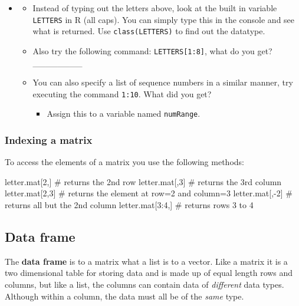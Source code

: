 \documentclass[a4paper]{book}
\newenvironment{Shaded}{}{}
\newcommand{\DecValTok}[1]{{#1}}
\newcommand{\CommentTok}[1]{\textcolor[rgb]{0.00,0.50,0.00}{{#1}}}
\newcommand{\NormalTok}[1]{{#1}}
\providecommand{\tightlist}{%
  \setlength{\itemsep}{0pt}\setlength{\parskip}{0pt}}
\newlength{\leftbarwidth}
\newlength{\leftbarsep}
\newcommand*{\leftbarcolorcmd}{\color{darkgray}}%
\renewenvironment{leftbar}{%
    \def\FrameCommand{{\leftbarcolorcmd{\vrule width \leftbarwidth\relax\hspace {\leftbarsep}}}}%
    \MakeFramed {\advance \hsize -\width \FrameRestore }%
}{%
    \endMakeFramed
}
\renewenvironment{Shaded}
{\vspace{0em}\begin{leftbar}\begin{snugshade}}
{\end{snugshade}\end{leftbar}\vspace{0pt}}
\newenvironment{rmdblock}[1]
  {\vspace{1.5em}\begin{shaded*}
  \begin{itemize}
  \renewcommand{\labelitemi}{
    \raisebox{-.7\height}[0pt][0pt]{
      {\setkeys{Gin}{width=3em,keepaspectratio}\texttt{[image: images/\#1]}}
    }
  }
  \item
  }
  {
  \end{itemize}
  \end{shaded*}
  }
\newenvironment{rmdtip}
  {\begin{rmdblock}{tip}}
  {\end{rmdblock}}
\begin{document}
\begin{rmdtip}
\begin{itemize}
\item
  Instead of typing out the letters above, look at the built in variable
  \texttt{LETTERS} in R (all caps). You can simply type this in the
  console and see what is returned. Use \texttt{class(LETTERS)} to find
  out the datatype.
\item
  Also try the following command: \texttt{LETTERS{[}1:8{]}}, what do you
  get? \_\_\_\_\_\_\_\_
\item
  You can also specify a list of sequence numbers in a similar manner,
  try executing the command \texttt{1:10}. What did you get?

  \begin{itemize}
  \tightlist
  \item
    Assign this to a variable named \texttt{numRange}.
  \end{itemize}
\end{itemize}
\end{rmdtip}

\subsubsection{Indexing a matrix}\label{indexing-a-matrix}

To access the elements of a matrix you use the following methods:

\begin{Shaded}
\begin{Highlighting}[]
\NormalTok{letter.mat[}\DecValTok{2}\NormalTok{,]   }\CommentTok{# returns the 2nd row}
\NormalTok{letter.mat[,}\DecValTok{3}\NormalTok{]   }\CommentTok{# returns the 3rd column}
\NormalTok{letter.mat[}\DecValTok{2}\NormalTok{,}\DecValTok{3}\NormalTok{]  }\CommentTok{# returns the element at row=2 and column=3}
\NormalTok{letter.mat[,-}\DecValTok{2}\NormalTok{]  }\CommentTok{# returns all but the 2nd column}
\NormalTok{letter.mat[}\DecValTok{3}\NormalTok{:}\DecValTok{4}\NormalTok{,] }\CommentTok{# returns rows 3 to 4}
\end{Highlighting}
\end{Shaded}

\subsection{Data frame}\label{data-frame}

The \textbf{data frame} is to a matrix what a list is to a vector. Like
a matrix it is a two dimensional table for storing data and is made up
of equal length rows and columns, but like a list, the columns can
contain data of \emph{different} data types. Although within a column,
the data must all be of the \emph{same} type.
\end{document}
